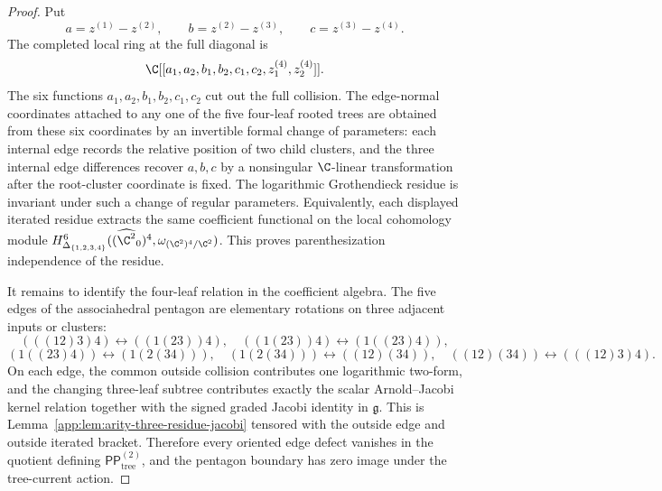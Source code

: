\begin{proof}
  Put
  \[
    a=z^{(1)}-z^{(2)},\qquad
    b=z^{(2)}-z^{(3)},\qquad
    c=z^{(3)}-z^{(4)}.
  \]
  The completed local ring at the full diagonal is
  \[
    \C[[a_1,a_2,b_1,b_2,c_1,c_2,z^{(4)}_1,z^{(4)}_2]].
  \]
  The six functions \(a_1,a_2,b_1,b_2,c_1,c_2\) cut out the full
  collision.  The edge-normal coordinates attached to any one of the
  five four-leaf rooted trees are obtained from these six coordinates
  by an invertible formal change of parameters: each internal edge
  records the relative position of two child clusters, and the three
  internal edge differences recover \(a,b,c\) by a nonsingular
  \(\C\)-linear transformation after the root-cluster coordinate is
  fixed.  The logarithmic Grothendieck residue is invariant under such
  a change of regular parameters.  Equivalently, each displayed
  iterated residue extracts the same coefficient functional on the
  local cohomology module
  \(H^6_{\Delta_{\{1,2,3,4\}}}((\widehat{\C^2}_0)^4,
  \omega_{(\C^2)^4/\C^2})\).  This proves parenthesization
  independence of the residue.

  It remains to identify the four-leaf relation in the coefficient
  algebra.  The five edges of the associahedral pentagon are elementary
  rotations on three adjacent inputs or clusters:
  \[
    (((12)3)4)\leftrightarrow ((1(23))4),\quad
    ((1(23))4)\leftrightarrow (1((23)4)),
  \]
  \[
    (1((23)4))\leftrightarrow (1(2(34))),\quad
    (1(2(34)))\leftrightarrow ((12)(34)),\quad
    ((12)(34))\leftrightarrow (((12)3)4).
  \]
  On each edge, the common outside collision contributes one logarithmic
  two-form, and the changing three-leaf subtree contributes exactly the
  scalar Arnold--Jacobi kernel relation together with the signed graded
  Jacobi identity in \(\mathfrak g\).  This is
  Lemma~\ref{app:lem:arity-three-residue-jacobi} tensored with the
  outside edge and outside iterated bracket.  Therefore every oriented
  edge defect vanishes in the quotient defining
  \(\mathsf{PP}^{(2)}_{\mathrm{tree}}\), and the pentagon boundary
  has zero image under the tree-current action.
\end{proof}

